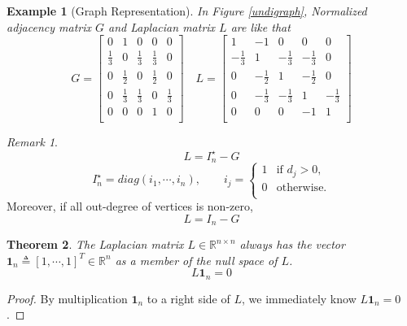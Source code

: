 \documentclass[11pt, a4paper, oneside, openany, reqno]{book}
\newtheorem{theorem}{Theorem}[chapter]
\newtheorem{example}{Example}
\theoremstyle{definition}
\theoremstyle{remark}
\newtheorem{remark}[theorem]{Remark}
\numberwithin{equation}{chapter} %
\newcommand{\R}{\ensuremath{{\mathbb R}}}
\newcommand{\ONE}{\textbf{1}}
\begin{document}
\begin{example}[Graph Representation]
	In Figure \ref{undigraph}, Normalized adjacency matrix $ G $ 
	and Laplacian matrix $ L $ are like that
	\begin{equation}
	G = \left[ \begin{array}{ccccc}
	0 & 1 & 0 & 0 & 0 \\
	\frac{1}{3} & 0 & \frac{1}{3} & \frac{1}{3} & 0 \\
	0 & \frac{1}{2} & 0 & \frac{1}{2} & 0 \\
	0 & \frac{1}{3} & \frac{1}{3} & 0 & \frac{1}{3} \\
	0 & 0 & 0 & 1 & 0 \\ 
	\end{array}  \right] 
	\quad L = \left[ \begin{array}{ccccc}
	1 & -1 & 0 & 0 & 0 \\
	-\frac{1}{3} & 1 & -\frac{1}{3} & -\frac{1}{3} & 0 \\
	0 & -\frac{1}{2} & 1 & -\frac{1}{2} & 0 \\
	0 & -\frac{1}{3} & -\frac{1}{3} & 1 & -\frac{1}{3} \\
	0 & 0 & 0 & -1 & 1 \\ 
	\end{array}  \right] 
	\end{equation}
\end{example}

\begin{remark}	
	\begin{equation}		L= I_n^\star -G	\end{equation}
	\begin{equation}	
		I_n^\star=diag(i_1,\cdots,i_n), \qquad i_j =	
		\begin{cases} 1 & \text{if } d_j > 0,	\\
		0 & \text{otherwise.} \\ \end{cases} 
	\end{equation}		
	Moreover, if all out-degree of vertices is non-zero,
	\begin{equation}
		L= I_n -G
	\end{equation}		
\end{remark}

\begin{theorem}
	The Laplacian matrix $ L \in \R^{n \times n} $ always has 
	the vector $ \ONE_n \triangleq [1, \cdots, 1]^T \in \R^n $ as a member of the null space of $ L $.
	\begin{equation}
	L \ONE_n = 0 
	\end{equation}
\end{theorem}
\begin{proof}
	By multiplication $ \ONE_n $ to a right side of $ L $, we immediately know $ L \ONE_n = 0  $.
\end{proof}
\end{document}
